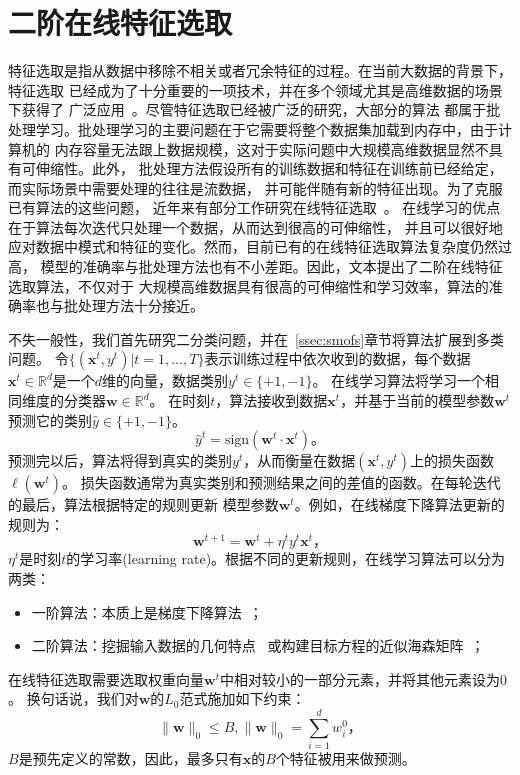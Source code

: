 \documentclass[doctor]{ustcthesis}
\def \w  {\mathbf{w}}
\def \x {\mathbf{x}}
\def \R {\mathbb{R}}
\def \sign {\mathrm{sign}}
\begin{document}
\section{二阶在线特征选取}
特征选取是指从数据中移除不相关或者冗余特征的过程。在当前大数据的背景下，特征选取
已经成为了十分重要的一项技术，并在多个领域尤其是高维数据的场景下获得了
广泛应用~\cite{Bolon015RAE,Zhai14EBD}。尽管特征选取已经被广泛的研究，大部分的算法
都属于批处理学习。批处理学习的主要问题在于它需要将整个数据集加载到内存中，由于计算机的
内存容量无法跟上数据规模，这对于实际问题中大规模高维数据显然不具有可伸缩性。此外，
批处理方法假设所有的训练数据和特征在训练前已经给定，而实际场景中需要处理的往往是流数据，
并可能伴随有新的特征出现。为了克服已有算法的这些问题，
近年来有部分工作研究在线特征选取~\cite{wang2014online,wu2010online,yang2013efficient}。
在线学习的优点在于算法每次迭代只处理一个数据，从而达到很高的可伸缩性，
并且可以很好地应对数据中模式和特征的变化。然而，目前已有的在线特征选取算法复杂度仍然过高，
模型的准确率与批处理方法也有不小差距。因此，文本提出了二阶在线特征选取算法，不仅对于
大规模高维数据具有很高的可伸缩性和学习效率，算法的准确率也与批处理方法十分接近。

不失一般性，我们首先研究二分类问题，并在~\ref{ssec:smofs}章节将算法扩展到多类问题。
令$\{(\x^t,y^t)|t=1,\ldots, T\}$表示训练过程中依次收到的数据，每个数据$\x^t
\in
\R^d$是一个$d$维的向量，数据类别$y^t\in\{+1,-1\}$。
在线学习算法将学习一个相同维度的分类器$\w \in \R^d$。
在时刻$t$，算法接收到数据$\x^t$，并基于当前的模型参数$\w^t$预测它的类别$\hat{y}\in\{+1,-1\}$。
\begin{equation}\label{eqn:predict}
    \hat{y}^t = \sign(\w^t \cdot \x^t)。
\end{equation}
预测完以后，算法将得到真实的类别$y^t$，从而衡量在数据$(\x^t,y^t)$上的损失函数$\ell(\w^t)$。
损失函数通常为真实类别和预测结果之间的差值的函数。在每轮迭代的最后，算法根据特定的规则更新
模型参数$\w^t$。例如，在线梯度下降算法更新的规则为：
\begin{equation}
    \w^{t+1} = \w^t + \eta^ty^t\x^t，
\end{equation}
$\eta^t$是时刻$t$的学习率(learning
rate)。根据不同的更新规则，在线学习算法可以分为两类：
\begin{itemize}
    \item 一阶算法：本质上是梯度下降算法~\cite{crammer2006online}；
    \item 二阶算法：挖掘输入数据的几何特点~\cite{crammer2009adaptive}
        或构建目标方程的近似海森矩阵~\cite{duchi2011adaptive}；
\end{itemize}
在线特征选取需要选取权重向量$\w^t$中相对较小的一部分元素，并将其他元素设为$0$。
换句话说，我们对$\w$的$L_0$范式施加如下约束：
\begin{equation}
    \|\w\|_0 \leq B, \|\w\|_0 = \sum_{i=1}^d w_i^0，
\end{equation}
$B$是预先定义的常数，因此，最多只有$\x$的$B$个特征被用来做预测。
\end{document}
